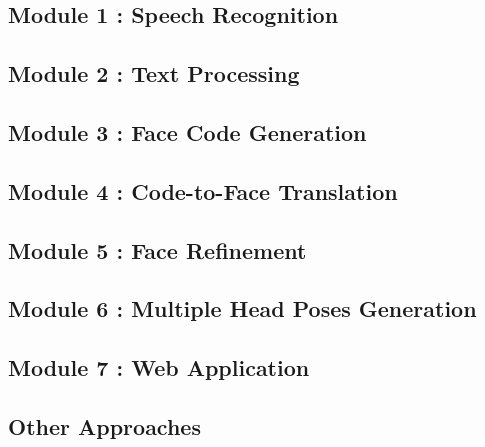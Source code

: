 \newpage

\subsection{Module 1 : Speech Recognition}
\label{sec:speech}


\newpage

\subsection{Module 2 : Text Processing}
\label{sec:text}


\newpage

\subsection{Module 3 : Face Code Generation}
\label{sec:code_gen}


\newpage

\subsection{Module 4 : Code-to-Face Translation}
\label{sec:face_gen}


\newpage

\subsection{Module 5 : Face Refinement}
\label{sec:face_ref}


\newpage

\subsection{Module 6 : Multiple Head Poses Generation}
\label{sec:poses}


\newpage

\subsection{Module 7 : Web Application}
\label{sec:web_app}


\newpage

\subsection{Other Approaches}
\label{sec:other_app}

